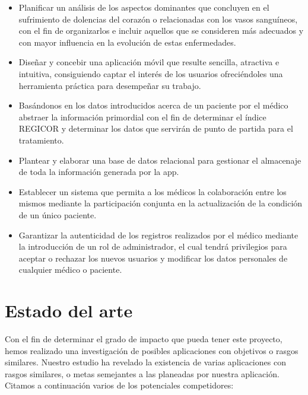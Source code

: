 \documentclass[11pt,spanish,
		listoftables,listoffigures]
		{tfgplantilla}
\begin{document}
\begin{itemize}
    \item Planificar un análisis de los aspectos dominantes que concluyen en el sufrimiento de dolencias del corazón o relacionadas con los vasos sanguíneos, con el fin de organizarlos e incluir aquellos que se consideren más adecuados y con mayor influencia en la evolución de estas enfermedades.

    \item Diseñar y concebir una aplicación móvil que resulte sencilla, atractiva e intuitiva, consiguiendo captar el interés de los usuarios ofreciéndoles una herramienta práctica para desempeñar su trabajo.
    
    \item Basándonos en los datos introducidos acerca de un paciente por el médico abstraer la información primordial con el fin de determinar el índice REGICOR y determinar los datos que servirán de punto de partida para el tratamiento.
    
    \item Plantear y elaborar una base de datos relacional para gestionar el almacenaje de toda la información generada por la app. 
    
    \item Establecer un sistema que permita a los médicos la colaboración entre los mismos mediante la participación conjunta en la actualización de la condición de un único paciente.
    
    \item Garantizar la autenticidad de los registros realizados por el médico mediante la introducción de un rol de administrador, el cual tendrá privilegios para aceptar o rechazar los nuevos usuarios y modificar los datos personales de cualquier médico o paciente. 
\end{itemize}

\section{Estado del arte}

Con el fin de determinar el grado de impacto que pueda tener este proyecto, hemos realizado una investigación de posibles aplicaciones con objetivos o rasgos similares. Nuestro estudio ha revelado la existencia de varias aplicaciones con rasgos similares, o metas semejantes a las planeadas por nuestra aplicación. Citamos a continuación varios de los potenciales competidores:
\end{document}
